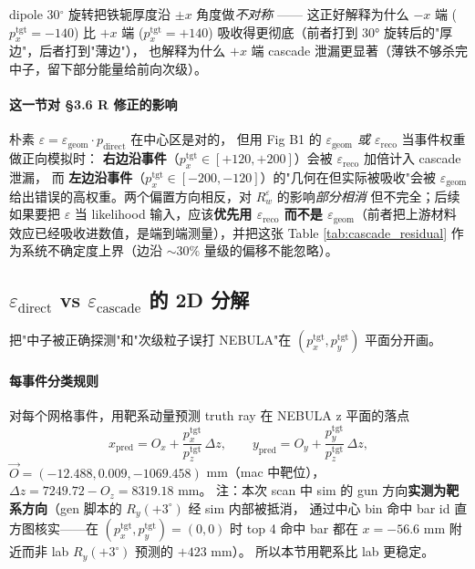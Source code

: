 \documentclass[a4paper,11pt]{ctexart}
\begin{document}
dipole 30$^\circ$ 旋转把铁轭厚度沿 $\pm x$ 角度做\emph{不对称} —— 这正好解释为什么 $-x$ 端 ($p_x^\mathrm{tgt}=-140$)
比 $+x$ 端 ($p_x^\mathrm{tgt}=+140$) 吸收得更彻底（前者打到 30° 旋转后的"厚边"，后者打到"薄边"），
也解释为什么 $+x$ 端 cascade 泄漏更显著（薄铁不够杀完中子，留下部分能量给前向次级）。

\paragraph{这一节对 \S3.6 R 修正的影响}
朴素 $\varepsilon = \varepsilon_\mathrm{geom} \cdot p_\mathrm{direct}$ 在中心区是对的，
但用 Fig B1 的 \emph{$\varepsilon_\mathrm{geom}$ 或 $\varepsilon_\mathrm{reco}$} 当事件权重做正向模拟时：
\textbf{右边沿事件}（$p_x^\mathrm{tgt} \in [+120, +200]$）会被 $\varepsilon_\mathrm{reco}$ 加倍计入 cascade 泄漏，
而 \textbf{左边沿事件}（$p_x^\mathrm{tgt} \in [-200, -120]$）的"几何在但实际被吸收"会被
$\varepsilon_\mathrm{geom}$ 给出错误的高权重。两个偏置方向相反，对 $R_w^\varepsilon$ 的影响\emph{部分相消}
但不完全；后续如果要把 $\varepsilon$ 当 likelihood 输入，应该\textbf{优先用 $\varepsilon_\mathrm{reco}$ 而不是
$\varepsilon_\mathrm{geom}$}（前者把上游材料效应已经吸收进数值，是端到端测量），并把这张
Table \ref{tab:cascade_residual} 作为系统不确定度上界（边沿 $\sim 30\%$ 量级的偏移不能忽略）。

\subsection{$\varepsilon_\mathrm{direct}$ vs $\varepsilon_\mathrm{cascade}$ 的 2D 分解}
\label{sec:direct_vs_cascade_2d}

把"中子被正确探测"和"次级粒子误打 NEBULA"在 $(p_x^\mathrm{tgt}, p_y^\mathrm{tgt})$ 平面分开画。

\paragraph{每事件分类规则}
对每个网格事件，用靶系动量预测 truth ray 在 NEBULA z 平面的落点
$$x_\mathrm{pred} = O_x + \frac{p_x^\mathrm{tgt}}{p_z^\mathrm{tgt}} \, \Delta z,
\qquad y_\mathrm{pred} = O_y + \frac{p_y^\mathrm{tgt}}{p_z^\mathrm{tgt}} \, \Delta z,$$
$\vec O = (-12.488, 0.009, -1069.458)$ mm（mac 中靶位），$\Delta z = 7249.72 - O_z = 8319.18$ mm。
注：本次 scan 中 sim 的 gun 方向\textbf{实测为靶系方向}（gen 脚本的 $R_y(+3^\circ)$ 经 sim 内部被抵消，
通过中心 bin 命中 bar id 直方图核实——在 $(p_x^\mathrm{tgt},p_y^\mathrm{tgt})=(0,0)$ 时
top 4 命中 bar 都在 $x=-56.6$ mm 附近而非 lab $R_y(+3^\circ)$ 预测的 $+423$ mm）。
所以本节用靶系比 lab 更稳定。
\end{document}
